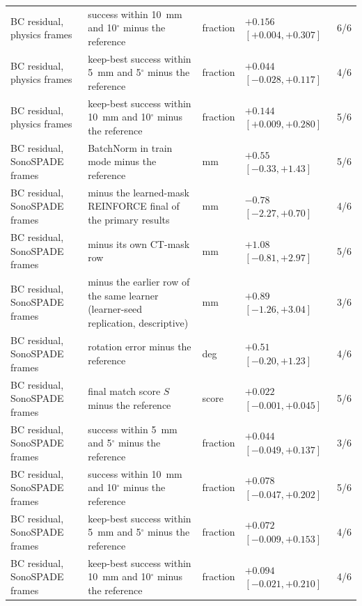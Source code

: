 \begin{table}[tp]
\begin{tabularx}{\textwidth}{@{}l >{\raggedright\arraybackslash}X l l c@{}}
BC residual, physics frames & success within 10~mm and 10$^\circ$ minus the reference & fraction & $+0.156$ $[+0.004, +0.307]$ & 6/6 \\
BC residual, physics frames & keep-best success within 5~mm and 5$^\circ$ minus the reference & fraction & $+0.044$ $[-0.028, +0.117]$ & 4/6 \\
BC residual, physics frames & keep-best success within 10~mm and 10$^\circ$ minus the reference & fraction & $+0.144$ $[+0.009, +0.280]$ & 5/6 \\
BC residual, SonoSPADE frames & BatchNorm in train mode minus the reference & mm & $+0.55$ $[-0.33, +1.43]$ & 5/6 \\
BC residual, SonoSPADE frames & minus the learned-mask REINFORCE final of the primary results & mm & $-0.78$ $[-2.27, +0.70]$ & 4/6 \\
BC residual, SonoSPADE frames & minus its own CT-mask row & mm & $+1.08$ $[-0.81, +2.97]$ & 5/6 \\
BC residual, SonoSPADE frames & minus the earlier row of the same learner (learner-seed replication, descriptive) & mm & $+0.89$ $[-1.26, +3.04]$ & 3/6 \\
BC residual, SonoSPADE frames & rotation error minus the reference & deg & $+0.51$ $[-0.20, +1.23]$ & 4/6 \\
BC residual, SonoSPADE frames & final match score $S$ minus the reference & score & $+0.022$ $[-0.001, +0.045]$ & 5/6 \\
BC residual, SonoSPADE frames & success within 5~mm and 5$^\circ$ minus the reference & fraction & $+0.044$ $[-0.049, +0.137]$ & 3/6 \\
BC residual, SonoSPADE frames & success within 10~mm and 10$^\circ$ minus the reference & fraction & $+0.078$ $[-0.047, +0.202]$ & 5/6 \\
BC residual, SonoSPADE frames & keep-best success within 5~mm and 5$^\circ$ minus the reference & fraction & $+0.072$ $[-0.009, +0.153]$ & 4/6 \\
BC residual, SonoSPADE frames & keep-best success within 10~mm and 10$^\circ$ minus the reference & fraction & $+0.094$ $[-0.021, +0.210]$ & 4/6 \\
\bottomrule
\end{tabularx}
\end{table}
